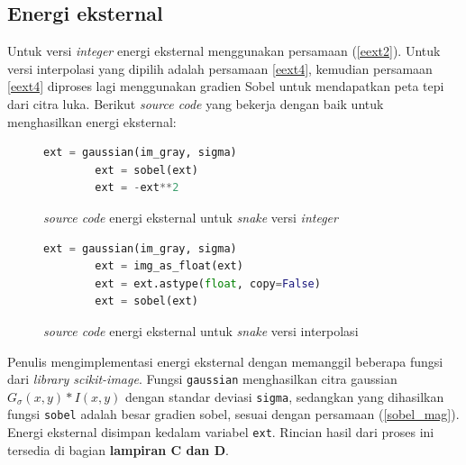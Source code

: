 \subsection{Energi eksternal}
Untuk versi \emph{integer} energi eksternal menggunakan persamaan (\ref{eext2}). Untuk versi interpolasi yang dipilih adalah persamaan \ref{eext4}, kemudian persamaan \ref{eext4} diproses lagi menggunakan gradien Sobel untuk mendapatkan peta tepi dari citra luka. Berikut \emph{source code} yang bekerja dengan baik untuk menghasilkan energi eksternal:
\begin{figure}[H]
	\begin{lstlisting}[language=Python, basicstyle=\tiny]
		ext = gaussian(im_gray, sigma)
		ext = sobel(ext)
		ext = -ext**2
	\end{lstlisting}
	\caption{\emph{source code} energi eksternal untuk \emph{snake} versi \emph{integer}}
	\label{Gambar:external_int}
\end{figure}
\begin{figure}[H]
	\begin{lstlisting}[language=Python, basicstyle=\tiny]
		ext = gaussian(im_gray, sigma)
		ext = img_as_float(ext)
		ext = ext.astype(float, copy=False)
		ext = sobel(ext)
	\end{lstlisting}
	\caption{\emph{source code} energi eksternal untuk \emph{snake} versi interpolasi}
	\label{Gambar:external_float}
\end{figure}
Penulis mengimplementasi energi eksternal dengan memanggil beberapa fungsi dari \emph{library scikit-image}. Fungsi \texttt{gaussian} menghasilkan citra gaussian $G_{\sigma} (x,y) * I(x,y)$ dengan standar deviasi \texttt{sigma}, sedangkan yang dihasilkan fungsi \texttt{sobel} adalah besar gradien sobel, sesuai dengan persamaan (\ref{sobel_mag}). Energi eksternal disimpan kedalam variabel \texttt{ext}. Rincian hasil dari proses ini tersedia di bagian \textbf{lampiran C dan D}.


